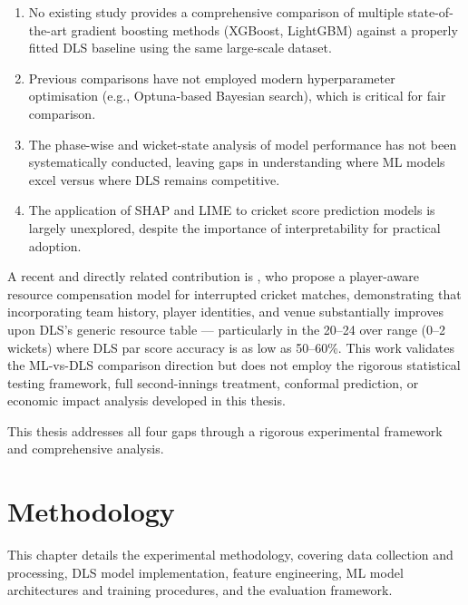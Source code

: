 \documentclass[12pt,a4paper,oneside]{report}
\begin{document}
\begin{enumerate}
    \item No existing study provides a comprehensive comparison of multiple state-of-the-art gradient boosting methods (XGBoost, LightGBM) against a properly fitted DLS baseline using the same large-scale dataset.

    \item Previous comparisons have not employed modern hyperparameter optimisation (e.g., Optuna-based Bayesian search), which is critical for fair comparison.

    \item The phase-wise and wicket-state analysis of model performance has not been systematically conducted, leaving gaps in understanding where ML models excel versus where DLS remains competitive.

    \item The application of SHAP and LIME to cricket score prediction models is largely unexplored, despite the importance of interpretability for practical adoption.
\end{enumerate}

A recent and directly related contribution is \citet{zia2022player}, who propose a player-aware resource compensation model for interrupted cricket matches, demonstrating that incorporating team history, player identities, and venue substantially improves upon DLS's generic resource table --- particularly in the 20--24 over range (0--2 wickets) where DLS par score accuracy is as low as 50--60\%.  This work validates the ML-vs-DLS comparison direction but does not employ the rigorous statistical testing framework, full second-innings treatment, conformal prediction, or economic impact analysis developed in this thesis.

This thesis addresses all four gaps through a rigorous experimental framework and comprehensive analysis.


\chapter{Methodology}
\label{ch:methodology}

This chapter details the experimental methodology, covering data collection and processing, DLS model implementation, feature engineering, ML model architectures and training procedures, and the evaluation framework.
\end{document}
